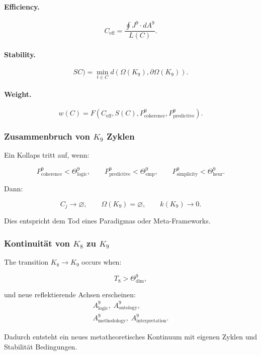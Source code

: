 \paragraph{Efficiency.}
\[
  C_{\mathrm{eff}} =
  \frac{\oint J^9 \cdot dA^9}{L(C)}.
\]

\paragraph{Stability.}
\[
SC)
    = \min_{t\in C}
      d(\Omega(K_9),\partial\Omega(K_9)).
\]

\paragraph{Weight.}
\[
  w(C) = F(C_{\mathrm{eff}}, S(C),
          P^9_{\mathrm{coherence}},
          P^9_{\mathrm{predictive}}).
\]


\subsubsection{Zusammenbruch von \texorpdfstring{$K_9$}{K_9} Zyklen}

Ein Kollaps tritt auf, wenn:

\[
  P^9_{\mathrm{coherence}} < \Theta^9_{\mathrm{logic}},\qquad
  P^9_{\mathrm{predictive}} < \Theta^9_{\mathrm{emp}},\qquad
  P^9_{\mathrm{simplicity}} < \Theta^9_{\mathrm{heur}}.
\]

Dann:

\[
  C_j \to \varnothing,\qquad
  \Omega(K_9)=\varnothing,\qquad
  k(K_9)\to 0.
\]

Dies entspricht dem Tod eines Paradigmas oder Meta-Frameworks.


\subsubsection{Kontinuität von \texorpdfstring{$K_8$}{K_8} zu \texorpdfstring{$K_9$}{K_9}}

The transition $K_8\to K_9$ occurs when:

\[
  T_8 > \Theta^9_{\mathrm{dim}},
\]

und neue reflektierende Achsen erscheinen:
\[
  \begin{aligned}
  A^9_{\mathrm{logic}},\;
  A^9_{\mathrm{ontology}},\\
  A^9_{\mathrm{methodology}},\;
  A^9_{\mathrm{interpretation}}.
  \end{aligned}
\]

Dadurch entsteht ein neues metatheoretisches Kontinuum mit eigenen Zyklen und Stabilität
Bedingungen.
